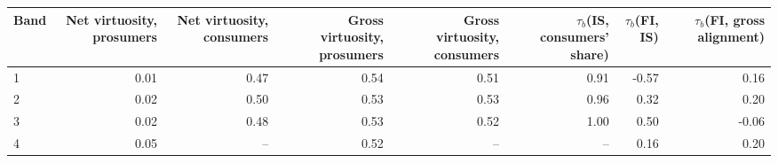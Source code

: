 \begin{tabular}{lrrrrrrr}
\toprule
Band & Net virtuosity, prosumers & Net virtuosity, consumers & Gross virtuosity, prosumers & Gross virtuosity, consumers & $\tau_b$(IS, consumers' share) & $\tau_b$(FI, IS) & $\tau_b$(FI, gross alignment) \\
\midrule
1 & 0.01 & 0.47 & 0.54 & 0.51 & 0.91 & -0.57 & 0.16 \\
2 & 0.02 & 0.50 & 0.53 & 0.53 & 0.96 & 0.32 & 0.20 \\
3 & 0.02 & 0.48 & 0.53 & 0.52 & 1.00 & 0.50 & -0.06 \\
4 & 0.05 & -- & 0.52 & -- & -- & 0.16 & 0.20 \\
\bottomrule
\end{tabular}
